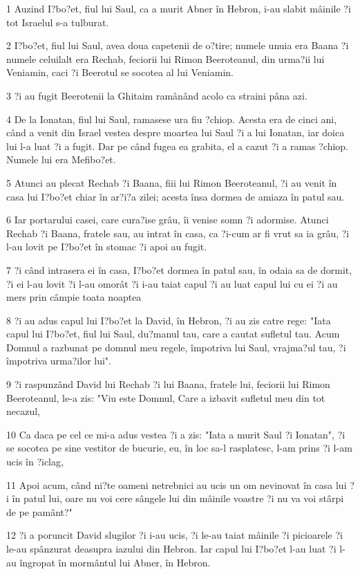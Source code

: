 \par 1 Auzind I?bo?et, fiul lui Saul, ca a murit Abner în Hebron, i-au slabit mâinile ?i tot Israelul s-a tulburat.
\par 2 I?bo?et, fiul lui Saul, avea doua capetenii de o?tire; numele unuia era Baana ?i numele celuilalt era Rechab, feciorii lui Rimon Beeroteanul, din urma?ii lui Veniamin, caci ?i Beerotul se socotea al lui Veniamin.
\par 3 ?i au fugit Beerotenii la Ghitaim ramânând acolo ca straini pâna azi.
\par 4 De la Ionatan, fiul lui Saul, ramasese ura fiu ?chiop. Acesta era de cinci ani, când a venit din Israel vestea despre moartea lui Saul ?i a lui Ionatan, iar doica lui l-a luat ?i a fugit. Dar pe când fugea ea grabita, el a cazut ?i a ramas ?chiop. Numele lui era Mefibo?et.
\par 5 Atunci au plecat Rechab ?i Baana, fiii lui Rimon Beeroteanul, ?i au venit în casa lui I?bo?et chiar în ar?i?a zilei; acesta însa dormea de amiaza în patul sau.
\par 6 Iar portarului casei, care cura?ise grâu, îi venise somn ?i adormise. Atunci Rechab ?i Baana, fratele sau, au intrat în casa, ca ?i-cum ar fi vrut sa ia grâu, ?i l-au lovit pe I?bo?et în stomac ?i apoi au fugit.
\par 7 ?i când intrasera ei în casa, I?bo?et dormea în patul sau, în odaia sa de dormit, ?i ei l-au lovit ?i l-au omorât ?i i-au taiat capul ?i au luat capul lui cu ei ?i au mers prin câmpie toata noaptea
\par 8 ?i au adus capul lui I?bo?et la David, în Hebron, ?i au zis catre rege: "Iata capul lui I?bo?et, fiul lui Saul, du?manul tau, care a cautat sufletul tau. Acum Domnul a razbunat pe domnul meu regele, împotriva lui Saul, vrajma?ul tau, ?i împotriva urma?ilor lui".
\par 9 ?i raspunzând David lui Rechab ?i lui Baana, fratele lui, feciorii lui Rimon Beeroteanul, le-a zis: "Viu este Domnul, Care a izbavit sufletul meu din tot necazul,
\par 10 Ca daca pe cel ce mi-a adus vestea ?i a zis: "Iata a murit Saul ?i Ionatan", ?i se socotea pe sine vestitor de bucurie, eu, în loc sa-l rasplatesc, l-am prins ?i l-am ucis în ?iclag,
\par 11 Apoi acum, când ni?te oameni netrebnici au ucis un om nevinovat în casa lui ?i în patul lui, oare nu voi cere sângele lui din mâinile voastre ?i nu va voi stârpi de pe pamânt?"
\par 12 ?i a poruncit David slugilor ?i i-au ucis, ?i le-au taiat mâinile ?i picioarele ?i le-au spânzurat deasupra iazului din Hebron. Iar capul lui I?bo?et l-au luat ?i l-au îngropat în mormântul lui Abner, în Hebron.


